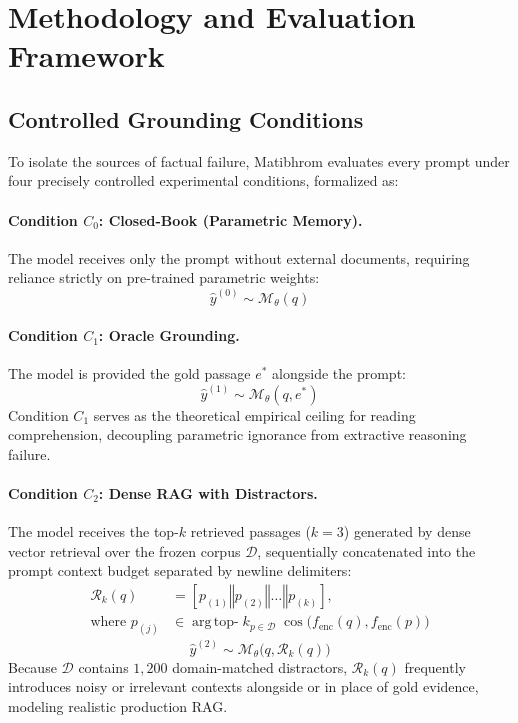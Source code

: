 \documentclass[11pt,a4paper,twocolumn]{article}
\begin{document}
\section{Methodology and Evaluation Framework}
\label{sec:methodology}

\subsection{Controlled Grounding Conditions}
To isolate the sources of factual failure, Matibhrom evaluates every prompt under four precisely controlled experimental conditions, formalized as:

\paragraph{Condition $C_0$: Closed-Book (Parametric Memory).} The model receives only the prompt without external documents, requiring reliance strictly on pre-trained parametric weights:
\begin{equation}
    \hat{y}^{(0)} \sim \mathcal{M}_\theta(q)
\end{equation}

\paragraph{Condition $C_1$: Oracle Grounding.} The model is provided the gold passage $e^*$ alongside the prompt:
\begin{equation}
    \hat{y}^{(1)} \sim \mathcal{M}_\theta(q, e^*)
\end{equation}
Condition $C_1$ serves as the theoretical empirical ceiling for reading comprehension, decoupling parametric ignorance from extractive reasoning failure.

\paragraph{Condition $C_2$: Dense RAG with Distractors.} The model receives the top-$k$ retrieved passages ($k=3$) generated by dense vector retrieval over the frozen corpus $\mathcal{D}$, sequentially concatenated into the prompt context budget separated by newline delimiters:
\begin{equation}
\begin{split}
    \mathcal{R}_k(q) &= [p_{(1)} \mathbin{\Vert} p_{(2)} \mathbin{\Vert} \dots \mathbin{\Vert} p_{(k)}], \\
    \text{where } p_{(j)} &\in \operatorname{arg\,top-}k_{p \in \mathcal{D}} \; \cos\big(f_{\text{enc}}(q), f_{\text{enc}}(p)\big)
\end{split}
\label{eq:rag_retrieval}
\end{equation}
\begin{equation}
    \hat{y}^{(2)} \sim \mathcal{M}_\theta\big(q, \mathcal{R}_k(q)\big)
\end{equation}
Because $\mathcal{D}$ contains $1,200$ domain-matched distractors, $\mathcal{R}_k(q)$ frequently introduces noisy or irrelevant contexts alongside or in place of gold evidence, modeling realistic production RAG.
\end{document}
